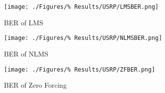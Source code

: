 \begin{figure}[ht]
	\centering
	\begin{minipage}{0.49\textwidth}
		\centering
		\texttt{[image: ./Figures/\%
		Results/USRP/LMSBER.png]}
		\caption{BER of LMS}
	\end{minipage}
	\begin{minipage}{0.49\textwidth}
		\centering
		\texttt{[image: ./Figures/\%
		Results/USRP/NLMSBER.png]}
		\caption{BER of NLMS}
		\label{fig:NLMS-BER-USRP}
	\end{minipage}
\end{figure}
\begin{figure}[ht]
	\centering
	\texttt{[image: ./Figures/\%
	Results/USRP/ZFBER.png]}
	\caption{BER of Zero Forcing}
\end{figure}
